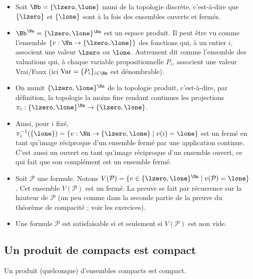 \documentclass[11pt,class=report,crop=false]{standalone}
\begin{document}
\begin{itemize}
	\item Soit $\Bb = \{\lzero,\lone\}$ muni de la topologie discrète, c'est-à-dire que $\{\lzero\}$ et $\{\lone\}$ sont à la fois des ensembles ouverts et fermés.

	\item $\Bb^\Nn = \{\lzero,\lone\}^\Nn$ est un espace produit. Il peut être vu comme l'ensemble $\{ v : \Nn \to \{\lzero,\lone\}\}$ des fonctions qui, à un entier $i$, associent une valeur $\lzero$ ou $\lone$. Autrement dit comme l'ensemble des valuations qui, à chaque variable propositionnelle $P_i$, associent une valeur Vrai/Faux (ici $\text{Var} = \{P_i\}_{i\in\Nn}$ est dénombrable).

	\item On munit $\{\lzero,\lone\}^\Nn$ de la topologie produit, c'est-à-dire, par définition, la topologie la moins fine rendant continues les projections $\pi_i : \{\lzero,\lone\}^\Nn \to \{\lzero,\lone\}$.

	\item Ainsi, pour $i$ fixé, $\pi_i^{-1}(\{\lone\}) = \{ v : \Nn \to \{\lzero,\lone\} \mid v(i) = \lone \}$ est un fermé en tant qu'image réciproque d'un ensemble fermé par une application continue. C'est aussi un ouvert en tant qu'image réciproque d'un ensemble ouvert, ce qui fait que son complément est un ensemble fermé.
	
	\item Soit $\mathcal{P}$ une formule. Notons $V(\mathcal{P}) = \{ v \in \{\lzero,\lone\}^\Nn \mid v(\mathcal{P}) = \lone \}$. Cet ensemble $V(\mathcal{P})$ est un fermé. La preuve se fait par récurrence sur la hauteur de $\mathcal{P}$ (un peu comme dans la seconde partie de la preuve du théorème de compacité ; voir les exercices).
	
	\item Une formule $\mathcal{P}$ est satisfaisable si et seulement si $V(\mathcal{P})$ est non vide.
\end{itemize}


\subsection{Un produit de compacts est compact}

\begin{theoreme}
	Un produit (quelconque) d'ensembles compacts est compact.
\end{theoreme}
\end{document}
